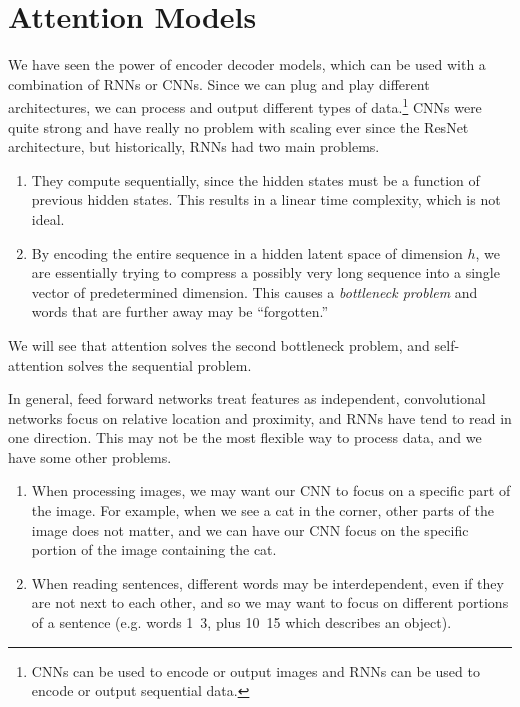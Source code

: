 \section{Attention Models}

    We have seen the power of encoder decoder models, which can be used with a combination of RNNs or CNNs. Since we can plug and play different architectures, we can process and output different types of data.\footnote{CNNs can be used to encode or output images and RNNs can be used to encode or output sequential data.} CNNs were quite strong and have really no problem with scaling ever since the ResNet architecture, but historically, RNNs had two main problems. 
    \begin{enumerate} 
      \item They compute sequentially, since the hidden states must be a function of previous hidden states. This results in a linear time complexity, which is not ideal. 
      \item By encoding the entire sequence in a hidden latent space of dimension $h$, we are essentially trying to compress a possibly very long sequence into a single vector of predetermined dimension. This causes a \textit{bottleneck problem} and words that are further away may be ``forgotten.''
    \end{enumerate}

    We will see that attention solves the second bottleneck problem, and self-attention solves the sequential problem. 

    In general, feed forward networks treat features as independent, convolutional networks focus on relative location and proximity, and RNNs have tend to read in one direction. This may not be the most flexible way to process data, and we have some other problems. 
    \begin{enumerate}
        \item When processing images, we may want our CNN to focus on a specific part of the image. For example, when we see a cat in the corner, other parts of the image does not matter, and we can have our CNN focus on the specific portion of the image containing the cat. 
        \item When reading sentences, different words may be interdependent, even if they are not next to each other, and so we may want to focus on different portions of a sentence (e.g. words 1~3, plus 10~15 which describes an object). 
    \end{enumerate}

